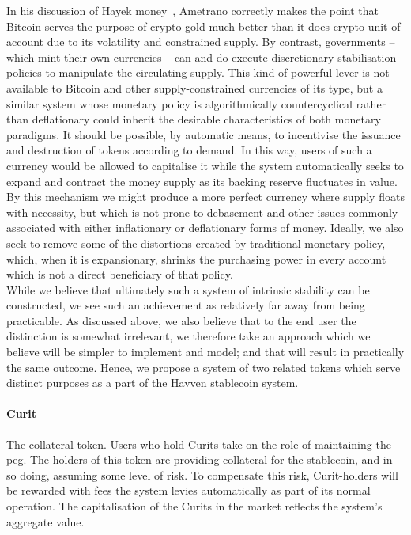 \noindent  In his discussion of Hayek money~\cite{ametrano2016hayek}, Ametrano correctly makes the point that
Bitcoin serves the purpose of crypto-gold much better than it does crypto-unit-of-account due to its volatility
and constrained supply. By contrast, governments -- which mint their own currencies -- can and do execute
discretionary stabilisation policies to manipulate the circulating supply. This kind of powerful lever is not
available to Bitcoin and other supply-constrained currencies of its type, but a similar system whose monetary
policy is algorithmically countercyclical rather than deflationary could inherit the desirable characteristics
of both monetary paradigms. It should be possible, by automatic means, to incentivise the issuance and
destruction of tokens according to demand. In this way, users of such a currency would be allowed to
capitalise it while the system automatically seeks to expand and contract the money supply as its backing
reserve fluctuates in value. By this mechanism we might produce a more perfect currency where supply floats
with necessity, but which is not prone to debasement and other issues commonly associated with either
inflationary or deflationary forms of money. Ideally, we also seek to remove some of the distortions created
by traditional monetary policy, which, when it is expansionary, shrinks the purchasing power in every account
which is not a direct beneficiary of that policy.\\

\noindent While we believe that ultimately such a system of intrinsic stability can be constructed, we see such
an achievement as relatively far away from being practicable. As discussed above, we also believe that to the
end user the distinction is somewhat irrelevant, we therefore take an approach which we believe will be simpler
to implement and model; and that will result in practically the same outcome. Hence, we propose a system of two
related tokens which serve distinct purposes as a part of the Havven stablecoin system.

\paragraph{Curit} The collateral token. Users who hold Curits take on the role of maintaining the peg. 
The holders of this token are providing collateral for the stablecoin, and in so doing, assuming some level of
risk. To compensate this risk, Curit-holders will be rewarded with fees the system levies automatically as part
of its normal operation. The capitalisation of the Curits in the market reflects the system's aggregate value.


